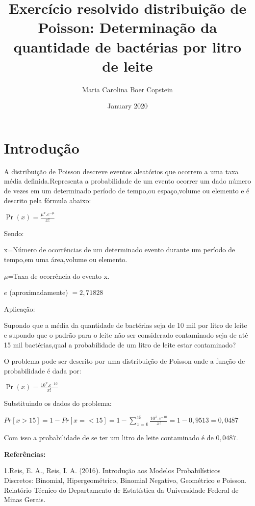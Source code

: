 \documentclass{article}
\title{Exercício resolvido distribuição de Poisson: Determinação da quantidade de bactérias por litro de leite}
\author{Maria Carolina Boer Copstein}
\date{January 2020}
\begin{document}
\maketitle
\section{Introdução}

\hfill

A distribuição de Poisson descreve eventos aleatórios que ocorrem a uma taxa média definida.Representa a probabilidade de um evento ocorrer um dado número de vezes em um determinado período de tempo,ou espaço,volume ou elemento e é descrito pela fórmula abaixo:

\begin{center}
    $\Pr(x)=\frac{\mu^{x}.e^{-\mu}}{x!}$
\end{center}

\hfill

Sendo:

\hfill

x=Número de ocorrências de um determinado evento durante um período de tempo,em uma área,volume ou elemento.

\hfill

$\mu$=Taxa de ocorrência do evento x.

\hfill

$e$ (aproximadamente) $=2,71828$

\hfill

Aplicação:

\hfill

Supondo que a média da quantidade de bactérias seja de 10 mil  por litro de leite e supondo que o padrão para  o leite não ser considerado contaminado seja de até 15 mil bactérias,qual a probabilidade de  um litro de leite estar contaminado?

\hfill

O problema pode ser descrito por uma distribuição de Poisson onde a função de probabilidade é dada por:
\begin{center}
    $\Pr(x)=\frac{10^{x}.e^{-10}}{x!}$
\end{center}


Substituindo os dados do problema:
\hfill

$Pr[x>15]=1-Pr[x=<15]=1-\sum_{x=0}^{15}\frac{10^{x}.e^{-10}}{x!}=1-0,9513=0,0487$

\hfill 

Com isso a probabilidade de se ter um litro de leite contaminado é de $0,0487$.

\hfill

\textbf{Referências:} \

\hfill

1.Reis, E. A., Reis, I. A. (2016). Introdução aos Modelos Probabilísticos Discretos: Binomial,
Hipergeométrico, Binomial Negativo, Geométrico e Poisson. Relatório Técnico do
Departamento de Estatística da Universidade Federal de Minas Gerais. 
\end{document}
